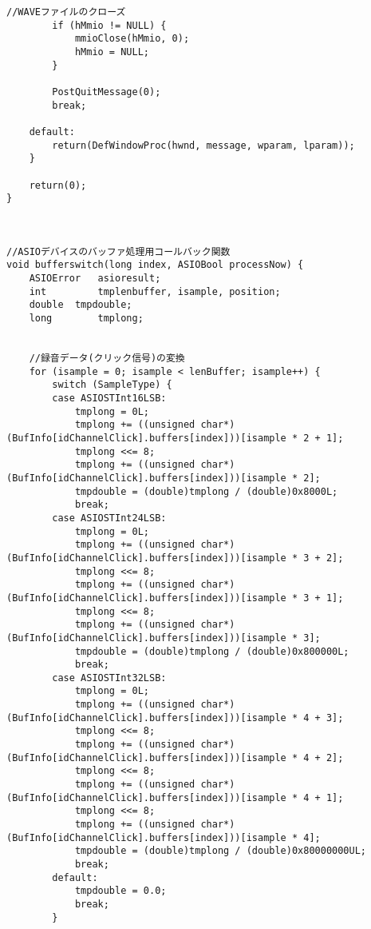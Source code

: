 \begin{lstlisting}[caption=main.cpp]
		//WAVEファイルのクローズ
		if (hMmio != NULL) {
			mmioClose(hMmio, 0);
			hMmio = NULL;
		}

		PostQuitMessage(0);
		break;

	default:
		return(DefWindowProc(hwnd, message, wparam, lparam));
	}

	return(0);
}



//ASIOデバイスのバッファ処理用コールバック関数
void bufferswitch(long index, ASIOBool processNow) {
	ASIOError	asioresult;
	int			tmplenbuffer, isample, position;
	double	tmpdouble;
	long		tmplong;
	

	//録音データ(クリック信号)の変換
	for (isample = 0; isample < lenBuffer; isample++) {
		switch (SampleType) {
		case ASIOSTInt16LSB:
			tmplong = 0L;
			tmplong += ((unsigned char*)(BufInfo[idChannelClick].buffers[index]))[isample * 2 + 1];
			tmplong <<= 8;
			tmplong += ((unsigned char*)(BufInfo[idChannelClick].buffers[index]))[isample * 2];
			tmpdouble = (double)tmplong / (double)0x8000L;
			break;
		case ASIOSTInt24LSB:
			tmplong = 0L;
			tmplong += ((unsigned char*)(BufInfo[idChannelClick].buffers[index]))[isample * 3 + 2];
			tmplong <<= 8;
			tmplong += ((unsigned char*)(BufInfo[idChannelClick].buffers[index]))[isample * 3 + 1];
			tmplong <<= 8;
			tmplong += ((unsigned char*)(BufInfo[idChannelClick].buffers[index]))[isample * 3];
			tmpdouble = (double)tmplong / (double)0x800000L;
			break;
		case ASIOSTInt32LSB:
			tmplong = 0L;
			tmplong += ((unsigned char*)(BufInfo[idChannelClick].buffers[index]))[isample * 4 + 3];
			tmplong <<= 8;
			tmplong += ((unsigned char*)(BufInfo[idChannelClick].buffers[index]))[isample * 4 + 2];
			tmplong <<= 8;
			tmplong += ((unsigned char*)(BufInfo[idChannelClick].buffers[index]))[isample * 4 + 1];
			tmplong <<= 8;
			tmplong += ((unsigned char*)(BufInfo[idChannelClick].buffers[index]))[isample * 4];
			tmpdouble = (double)tmplong / (double)0x80000000UL;
			break;
		default:
			tmpdouble = 0.0;
			break;
		}


\end{lstlisting}

